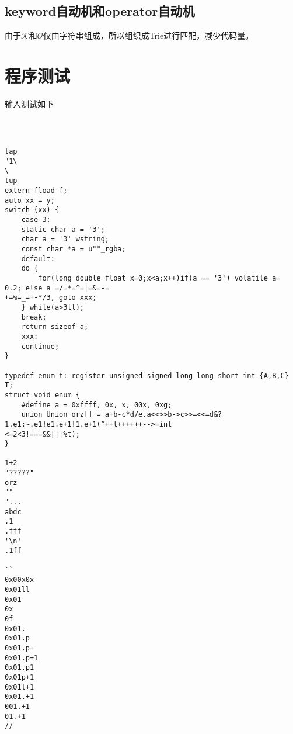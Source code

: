 \documentclass[UTF8]{ctexart}
\begin{document}
\subsection{keyword自动机和operator自动机}
由于$\mathcal{K}$和$\mathcal{O}$仅由字符串组成，所以组织成Trie进行匹配，减少代码量。

\section{程序测试}
输入测试如下
{\firacode
\begin{lstlisting}



tap
"1\
\
tup
extern fload f;
auto xx = y;
switch (xx) {
    case 3:
    static char a = '3';
    char a = '3'_wstring;
    const char *a = u""_rgba;
    default:
    do {
        for(long double float x=0;x<a;x++)if(a == '3') volatile a= 0.2; else a =/=*=^=|=&=-=
+=%=_=+-*/3, goto xxx;
    } while(a>3ll);
    break;
    return sizeof a;
    xxx:
    continue;
}

typedef enum t: register unsigned signed long long short int {A,B,C} T;
struct void enum {
    #define a = 0xffff, 0x, x, 00x, 0xg;
    union Union orz[] = a+b-c*d/e.a<<>>b->c>>=<<=d&?1.e1:~.e1!e1.e+1!1.e+1(^++t++++++-->=int
<=2<3!===&&|||%t);
}

1+2
"?????"
orz
""
"...
abdc
.1
.fff
'\n'
.1ff

``
0x00x0x
0x01ll
0x01
0x
0f
0x01.
0x01.p
0x01.p+
0x01.p+1
0x01.p1
0x01p+1
0x01l+1
0x01.+1
001.+1
01.+1
//
\end{lstlisting}
}
\end{document}
